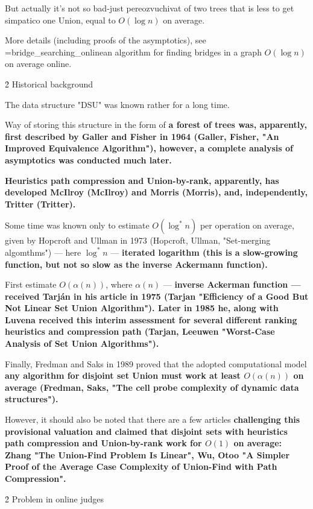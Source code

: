 But actually it's not so bad-just pereozvuchivat of two trees that is less to get simpatico one Union, equal to $O (\log n)$ on average.

More details (including proofs of the asymptotics), see \algohref=bridge_searching_online{an algorithm for finding bridges in a graph $O(\log n)$ on average online}.




\h2{ Historical background }

The data structure "DSU" was known rather for a long time.

Way of storing this structure in the form of \bf{a forest of trees} was, apparently, first described by Galler and Fisher in 1964 (Galler, Fisher, "An Improved Equivalence Algorithm"), however, a complete analysis of asymptotics was conducted much later.

\bf{Heuristics} path compression and Union-by-rank, apparently, has developed McIlroy (McIlroy) and Morris (Morris), and, independently, Tritter (Tritter).

Some time was known only to estimate $O(\log^* n)$ per operation on average, given by Hopcroft and Ullman in 1973 (Hopcroft, Ullman, "Set-merging algomthms") --- here $\log^* n$ --- \bf{iterated logarithm} (this is a slow-growing function, but not so slow as the inverse Ackermann function).

First estimate $O (\alpha(n))$, where $\alpha(n)$ --- \bf{inverse Ackerman function} --- received Tarján in his article in 1975 (Tarjan "Efficiency of a Good But Not Linear Set Union Algorithm"). Later in 1985 he, along with Luvena received this interim assessment for several different ranking heuristics and compression path (Tarjan, Leeuwen "Worst-Case Analysis of Set Union Algorithms").

Finally, Fredman and Saks in 1989 proved that the adopted computational model \bf{any} algorithm for disjoint set Union must work at least $O(\alpha(n))$ on average (Fredman, Saks, "The cell probe complexity of dynamic data structures").

However, it should also be noted that there are a few articles \bf{challenging} this provisional valuation and claimed that disjoint sets with heuristics path compression and Union-by-rank work for $O(1)$ on average: Zhang "The Union-Find Problem Is Linear", Wu, Otoo "A Simpler Proof of the Average Case Complexity of Union-Find with Path Compression".



\h2{ Problem in online judges }

